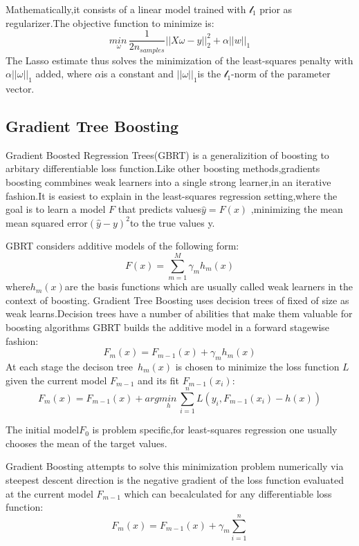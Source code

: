 \documentclass[10pt,a4paper]{ctexart}
\begin{document}
    Mathematically,it consists of a linear model trained with $\mathcal{l}_1$ prior as regularizer.The objective function to minimize is:
    \begin{equation*}
    	\underset{\omega}{min\,}{\dfrac{1}{2n_{samples}}||X\omega-y||_2^2}+\alpha||w||_1
    \end{equation*}
    The Lasso estimate thus solves the minimization of the least-squares penalty with $\alpha||\omega||_1$ added,
    where $\alpha$is a constant and $||\omega||_1$is the $\mathcal{l}_1$-norm of the parameter vector.
    \subsection{Gradient Tree Boosting}
    Gradient Boosted Regression Trees(GBRT) is a generalizition of boosting to arbitary
    differentiable loss function.Like other boosting methods,gradients boosting commbines weak learners into a single strong learner,in an iterative
    fashion.It is easiest to explain in the least-squares regression setting,where the goal is to learn a model $F$ that predicts values$\hat{y}=F(x)$
    ,minimizing the mean mean squared error$(\hat{y}-y)^2$to the true values y.
    
    GBRT considers additive models of the following form:
    \begin{equation*}
        F(x)=\sum_{m=1}^{M}\gamma_{m}h_m(x)
    \end{equation*}
    where$h_m(x)$are the basis functions which are usually called weak learners in the context of boosting.
    Gradient Tree Boosting uses decision trees of fixed of size as weak learns.Decision trees have a number of 
    abilities that make them valuable for boosting algorithms GBRT builds the additive model in a forward stagewise fashion:
    \begin{equation*}
        F_m(x)=F_{m-1}(x)+\gamma_mh_m(x)
    \end{equation*}
    At each stage the decison tree\ $h_m(x)$ is chosen to minimize the loss function $L$ given the current model
    $F_{m-1}$ and its fit $F_{m-1}(x_i)$:
    \begin{equation*}
        F_m(x)=F_{m-1}(x)+arg\underset{h}{min\,}\sum_{i=1}^{n}L(y_i,F_{m-1}(x_i)-h(x))
    \end{equation*}

    The initial model$F_0$ is problem specific,for least-squares regression one usually chooses the mean of the target values.

    Gradient Boosting attempts to solve this minimization problem numerically via steepest descent
    direction is the negative gradient of the loss function evaluated at the current model $F_{m-1}$ which can becalculated for 
    any differentiable loss function:
    \begin{equation*}
        F_m(x)=F_{m-1}(x)+\gamma_m\sum_{i=1}^{n}
    \end{equation*}
\end{document}
